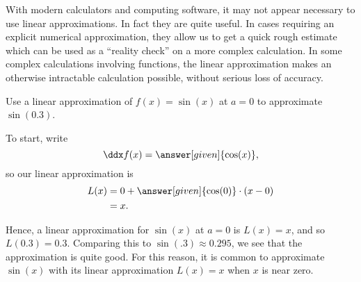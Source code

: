 \documentclass{ximera}
\begin{document}
With modern calculators and computing software, it may not appear
necessary to use linear approximations. In fact they are quite
useful. In cases requiring an explicit numerical approximation, they
allow us to get a quick rough estimate which can be used as a
``reality check'' on a more complex calculation. In some complex
calculations involving functions, the linear approximation makes an
otherwise intractable calculation possible, without serious loss of
accuracy.

\begin{example}%
	Use a linear approximation of $f(x) =\sin(x)$ at $a=0$ to approximate
	$\sin(0.3)$.
	\begin{explanation}
		To start, write
		\[ \ddx f(x) = \answer[given]{\cos(x)}, \]
		so our linear approximation is
		\begin{align*}
			L(x) &= 0+\answer[given]{\cos(0)}\cdot(x-0)\\
				&= x.
		\end{align*}
		\begin{image}
		\end{image}
		Hence, a linear approximation for $\sin(x)$ at $a=0$ is $L(x) = x$,
		and so $L(0.3) = 0.3$.  Comparing this to $\sin(.3) \approx 0.295$,
		we see that the approximation is quite good. For this reason, it is common
		to approximate $\sin(x)$ with its linear approximation $L(x) = x$
		when $x$ is near zero.  
	\end{explanation}
\end{example}
\end{document}
